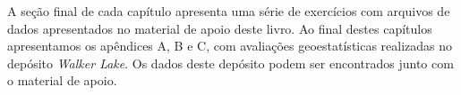\documentclass[12pt,fleqn]{book} %
\begin{document}
A seção final de cada capítulo apresenta uma série de exercícios com arquivos de dados apresentados no material de apoio deste livro. Ao final destes capítulos apresentamos os apêndices A, B e C, com avaliações geoestatísticas realizadas no depósito \textit{Walker Lake}. Os dados deste depósito podem ser encontrados junto com o material de apoio.



































\cleardoublepage
{}
\setlength{\columnsep}{0.75cm}
\printindex

\end{document}
